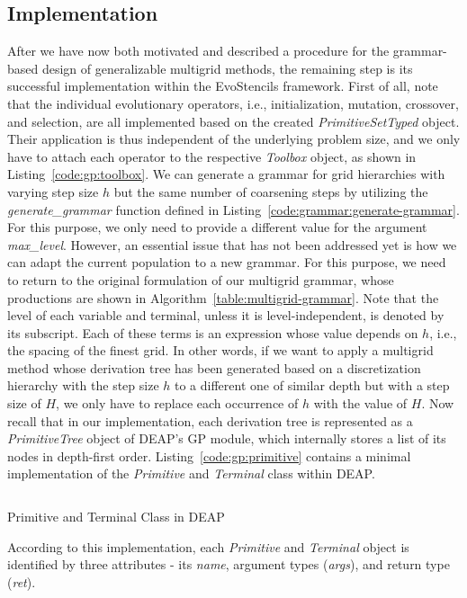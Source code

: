\subsection{Implementation}
After we have now both motivated and described a procedure for the grammar-based design of generalizable multigrid methods, the remaining step is its successful implementation within the EvoStencils framework.
First of all, note that the individual evolutionary operators, i.e., initialization, mutation, crossover, and selection, are all implemented based on the created \emph{PrimitiveSetTyped} object. 
Their application is thus independent of the underlying problem size, and we only have to attach each operator to the respective \emph{Toolbox} object, as shown in Listing~\ref{code:gp:toolbox}.
We can generate a grammar for grid hierarchies with varying step size $h$ but the same number of coarsening steps by utilizing the \emph{generate\_grammar} function defined in Listing~\ref{code:grammar:generate-grammar}.
For this purpose, we only need to provide a different value for the argument \emph{max\_level}.
However, an essential issue that has not been addressed yet is how we can adapt the current population to a new grammar.
For this purpose, we need to return to the original formulation of our multigrid grammar, whose productions are shown in Algorithm~\ref{table:multigrid-grammar}.
Note that the level of each variable and terminal, unless it is level-independent, is denoted by its subscript.
Each of these terms is an expression whose value depends on $h$, i.e., the spacing of the finest grid.
In other words, if we want to apply a multigrid method whose derivation tree has been generated based on a discretization hierarchy with the step size $h$ to a different one of similar depth but with a step size of $H$, we only have to replace each occurrence of $h$ with the value of $H$.
Now recall that in our implementation, each derivation tree is represented as a \emph{PrimitiveTree} object of DEAP's GP module, which internally stores a list of its nodes in depth-first order.
Listing~\ref{code:gp:primitive} contains a minimal implementation of the \emph{Primitive} and \emph{Terminal} class within DEAP.
\begin{listing}
	\inputminted{python}{evostencils/gp/primitive.py}
	\caption{Primitive and Terminal Class in DEAP}
	\label{code:gp:primitive}
\end{listing}
According to this implementation, each \emph{Primitive} and \emph{Terminal} object is identified by three attributes - its \emph{name}, argument types (\emph{args}), and return type (\emph{ret}).
